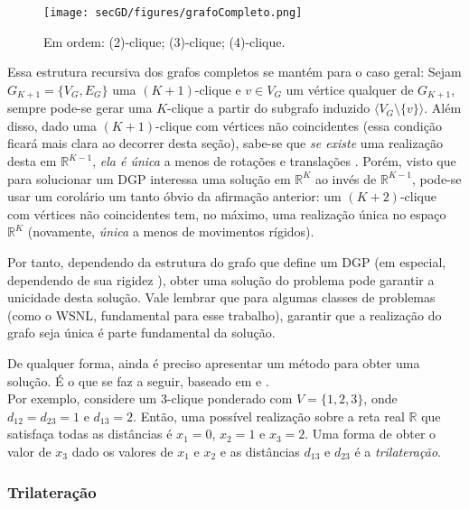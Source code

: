 \begin{figure}[H]
	\begin{center}
		\texttt{[image: secGD/figures/grafoCompleto.png]}
	\end{center}
	\caption{Em ordem: (2)-clique; (3)-clique; (4)-clique.}
	\label{fig:grafoCompleto}
\end{figure}

Essa estrutura recursiva dos grafos completos se mantém para o caso geral: Sejam $G_{K+1} = \{V_G, E_G\}$ uma $(K+1)$-clique e $v \in V_G$ um vértice qualquer de $G_{K+1}$, sempre pode-se gerar uma $K$-clique a partir do subgrafo induzido $\langle V_G \setminus \{v\}\rangle$. Além disso, dado uma $(K+1)$-clique com vértices não coincidentes (essa condição ficará mais clara ao decorrer desta seção), sabe-se que \textit{se existe} uma realização desta em $\mathbb{R}^{K-1}$, \textit{ela é única} a menos de rotações e translações \cite{libertiEDG}. Porém, visto que para solucionar um DGP interessa uma solução em $\mathbb{R}^K$ ao invés de $\mathbb{R}^{K-1}$, pode-se usar um corolário um tanto óbvio da afirmação anterior: um $(K+2)$-clique com vértices não coincidentes tem, no máximo, uma realização única no espaço $\mathbb{R}^K$ (novamente, \textit{única} a menos de movimentos rígidos). 

Por tanto, dependendo da estrutura do grafo que define um DGP (em especial, dependendo de sua rigidez \cite{eren2004rigidity, alfakihEuclideanDistanceMatricesApplicationsRigidity}), obter uma solução do problema pode garantir a unicidade desta solução. Vale lembrar que para algumas classes de problemas (como o WSNL, fundamental para esse trabalho), garantir que a realização do grafo seja única é parte fundamental da solução. 

De qualquer forma, ainda é preciso apresentar um método para obter uma solução.  É o que se faz a seguir, baseado em \cite{libertiEDG} e \cite{trilaterationDong}. 
\\

Por exemplo, considere um 3-clique ponderado com $V = \{1,2,3\}$, onde $d_{12} = d_{23} = 1$ e $d_{13} = 2$. Então, uma possível realização sobre a reta real $\mathbb{R}$ que satisfaça todas as distâncias é $x_1 = 0$, $x_2 = 1$ e $x_3 = 2$. Uma forma de obter o valor de $x_3$ dado os valores de $x_1$ e $x_2$ e as distâncias $d_{13}$ e $d_{23}$ é a \textit{trilateração}.

\subsubsection{Trilateração}

